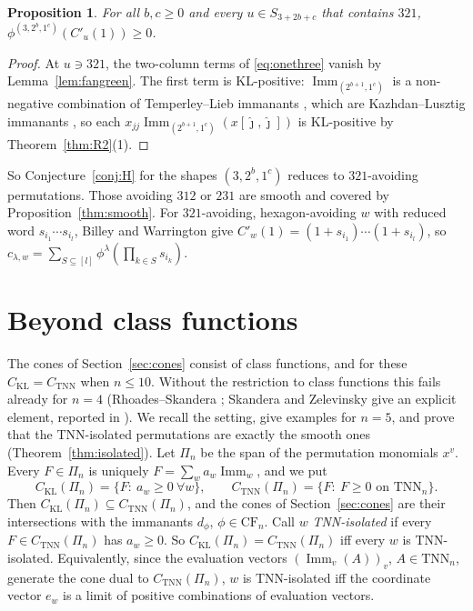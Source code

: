 \documentclass[11pt]{amsart}
\newtheorem{proposition}[theorem]{Proposition}
\theoremstyle{definition}
\theoremstyle{remark}
\newcommand{\Imm}{\operatorname{Imm}}
\newcommand{\TNN}{\mathrm{TNN}}
\newcommand{\CF}{\mathrm{CF}}
\newcommand{\CKL}{C_{\mathrm{KL}}}
\newcommand{\CTNN}{C_{\mathrm{TNN}}}
\newcommand{\Cp}[1]{C'_{#1}(1)}
\begin{document}
\begin{proposition}\label{prop:onethree}
For all $b,c\ge0$ and every $u\in S_{3+2b+c}$ that contains $321$, $\phi^{(3,2^b,1^c)}(\Cp u)\ge 0$.
\end{proposition}

\begin{proof}
At $u\ni321$, the two-column terms of \eqref{eq:onethree} vanish by Lemma~\ref{lem:fangreen}. The first term is KL-positive: $\Imm_{(2^{b+1},1^c)}$ is a non-negative combination of Temperley--Lieb immanants \cite{CSS}, which are Kazhdan--Lusztig immanants \cite{RS06}, so each $x_{jj}\Imm_{(2^{b+1},1^c)}(x[\hat\jmath,\hat\jmath])$ is KL-positive by Theorem~\ref{thm:R2}(1).
\end{proof}

So Conjecture~\ref{conj:H} for the shapes $(3,2^b,1^c)$ reduces to $321$-avoiding permutations. Those avoiding $312$ or $231$ are smooth and covered by Proposition~\ref{thm:smooth}. For $321$-avoiding, hexagon-avoiding $w$ with reduced word $s_{i_1}\cdots s_{i_l}$, Billey and Warrington \cite[Thm.~1]{BW} give $\Cp w=(1+s_{i_1})\cdots(1+s_{i_l})$, so $c_{\lambda,w}=\sum_{S\subseteq[l]}\phi^\lambda(\prod_{k\in S}s_{i_k})$.

\section{Beyond class functions}\label{sec:beyond}

The cones of Section~\ref{sec:cones} consist of class functions, and for these $\CKL=\CTNN$ when $n\le10$. Without the restriction to class functions this fails already for $n=4$ (Rhoades--Skandera \cite[\S7]{RS06}; Skandera and Zelevinsky give an explicit element, reported in \cite[(5.1)]{Ska08}). We recall the setting, give examples for $n=5$, and prove that the TNN-isolated permutations are exactly the smooth ones (Theorem~\ref{thm:isolated}). Let $\Pi_n$ be the span of the permutation monomials $x^v$. Every $F\in\Pi_n$ is uniquely $F=\sum_wa_w\Imm_w$, and we put
\[
\CKL(\Pi_n)=\{F:\ a_w\ge0\ \forall w\},\qquad \CTNN(\Pi_n)=\{F:\ F\ge0\text{ on }\TNN_n\}.
\]
Then $\CKL(\Pi_n)\subseteq\CTNN(\Pi_n)$, and the cones of Section~\ref{sec:cones} are their intersections with the immanants $d_\phi$, $\phi\in\CF_n$. Call $w$ \emph{TNN-isolated} if every $F\in\CTNN(\Pi_n)$ has $a_w\ge0$. So $\CKL(\Pi_n)=\CTNN(\Pi_n)$ iff every $w$ is TNN-isolated. Equivalently, since the evaluation vectors $(\Imm_v(A))_v$, $A\in\TNN_n$, generate the cone dual to $\CTNN(\Pi_n)$, $w$ is TNN-isolated iff the coordinate vector $e_w$ is a limit of positive combinations of evaluation vectors.
\end{document}
